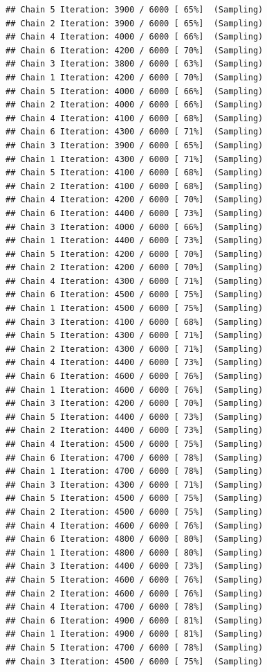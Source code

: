 \documentclass[
]{article}
\begin{document}
\begin{verbatim}
## Chain 5 Iteration: 3900 / 6000 [ 65%]  (Sampling) 
## Chain 2 Iteration: 3900 / 6000 [ 65%]  (Sampling) 
## Chain 4 Iteration: 4000 / 6000 [ 66%]  (Sampling) 
## Chain 6 Iteration: 4200 / 6000 [ 70%]  (Sampling) 
## Chain 3 Iteration: 3800 / 6000 [ 63%]  (Sampling) 
## Chain 1 Iteration: 4200 / 6000 [ 70%]  (Sampling) 
## Chain 5 Iteration: 4000 / 6000 [ 66%]  (Sampling) 
## Chain 2 Iteration: 4000 / 6000 [ 66%]  (Sampling) 
## Chain 4 Iteration: 4100 / 6000 [ 68%]  (Sampling) 
## Chain 6 Iteration: 4300 / 6000 [ 71%]  (Sampling) 
## Chain 3 Iteration: 3900 / 6000 [ 65%]  (Sampling) 
## Chain 1 Iteration: 4300 / 6000 [ 71%]  (Sampling) 
## Chain 5 Iteration: 4100 / 6000 [ 68%]  (Sampling) 
## Chain 2 Iteration: 4100 / 6000 [ 68%]  (Sampling) 
## Chain 4 Iteration: 4200 / 6000 [ 70%]  (Sampling) 
## Chain 6 Iteration: 4400 / 6000 [ 73%]  (Sampling) 
## Chain 3 Iteration: 4000 / 6000 [ 66%]  (Sampling) 
## Chain 1 Iteration: 4400 / 6000 [ 73%]  (Sampling) 
## Chain 5 Iteration: 4200 / 6000 [ 70%]  (Sampling) 
## Chain 2 Iteration: 4200 / 6000 [ 70%]  (Sampling) 
## Chain 4 Iteration: 4300 / 6000 [ 71%]  (Sampling) 
## Chain 6 Iteration: 4500 / 6000 [ 75%]  (Sampling) 
## Chain 1 Iteration: 4500 / 6000 [ 75%]  (Sampling) 
## Chain 3 Iteration: 4100 / 6000 [ 68%]  (Sampling) 
## Chain 5 Iteration: 4300 / 6000 [ 71%]  (Sampling) 
## Chain 2 Iteration: 4300 / 6000 [ 71%]  (Sampling) 
## Chain 4 Iteration: 4400 / 6000 [ 73%]  (Sampling) 
## Chain 6 Iteration: 4600 / 6000 [ 76%]  (Sampling) 
## Chain 1 Iteration: 4600 / 6000 [ 76%]  (Sampling) 
## Chain 3 Iteration: 4200 / 6000 [ 70%]  (Sampling) 
## Chain 5 Iteration: 4400 / 6000 [ 73%]  (Sampling) 
## Chain 2 Iteration: 4400 / 6000 [ 73%]  (Sampling) 
## Chain 4 Iteration: 4500 / 6000 [ 75%]  (Sampling) 
## Chain 6 Iteration: 4700 / 6000 [ 78%]  (Sampling) 
## Chain 1 Iteration: 4700 / 6000 [ 78%]  (Sampling) 
## Chain 3 Iteration: 4300 / 6000 [ 71%]  (Sampling) 
## Chain 5 Iteration: 4500 / 6000 [ 75%]  (Sampling) 
## Chain 2 Iteration: 4500 / 6000 [ 75%]  (Sampling) 
## Chain 4 Iteration: 4600 / 6000 [ 76%]  (Sampling) 
## Chain 6 Iteration: 4800 / 6000 [ 80%]  (Sampling) 
## Chain 1 Iteration: 4800 / 6000 [ 80%]  (Sampling) 
## Chain 3 Iteration: 4400 / 6000 [ 73%]  (Sampling) 
## Chain 5 Iteration: 4600 / 6000 [ 76%]  (Sampling) 
## Chain 2 Iteration: 4600 / 6000 [ 76%]  (Sampling) 
## Chain 4 Iteration: 4700 / 6000 [ 78%]  (Sampling) 
## Chain 6 Iteration: 4900 / 6000 [ 81%]  (Sampling) 
## Chain 1 Iteration: 4900 / 6000 [ 81%]  (Sampling) 
## Chain 5 Iteration: 4700 / 6000 [ 78%]  (Sampling) 
## Chain 3 Iteration: 4500 / 6000 [ 75%]  (Sampling) 

\end{verbatim}
\end{document}

